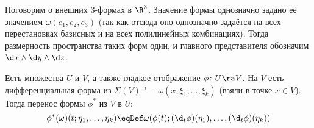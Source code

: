 \begin{Rem}
	Поговорим о внешних 3-формах в $\R^3$. Значение формы однозначно задано её значением $\omega(e_1, e_2, e_3)$
	(так как отсюда оно однозначно задаётся на всех перестановках базисных и на всех полилинейных комбинациях).
	Тогда размерность пространства таких форм один, и главного представителя обозначим $\d x \wedge \d y \wedge \d z$.
\end{Rem}

\begin{Def}
	Есть множества $U$ и $V$, а также гладкое отображение $\phi\colon U \ra V$.
	На $V$ есть дифференциальная форма из $\Sigma(V)$ "--- $\omega(x; \xi_1, \dots, \xi_k)$ (взяли в точке $x \in V$).
	Тогда перенос формы $\phi^*$ из $V$ в $U$:
	\[ \phi^*(\omega)(t;\eta_1,\dots,\eta_k) \eqDef \omega(\phi(t); (\d_t \phi)(\eta_1), \dots, (\d_t \phi)(\eta_k)) \]
\end{Def}

